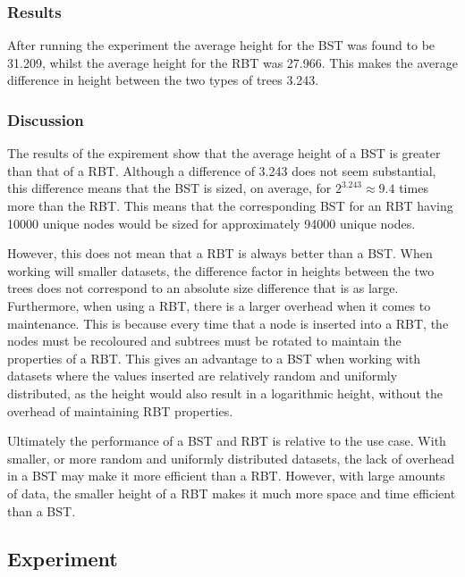 \documentclass[letterpaper]{article}
\theoremstyle{plain}
\theoremstyle{definition}
\theoremstyle{remark}
\newcounter{experiment}
\begin{document}
\subsubsection*{Results}
After running the experiment the average height for the BST was found to be 31.209, whilst the average height for the RBT was 27.966. This makes the average difference in height between the two types of trees 3.243.
\subsubsection*{Discussion}
The results of the expirement show that the average height of a BST is greater than that of a RBT. Although a difference of 3.243 does not seem substantial, this difference means that the BST is sized, on average, for $2^{3.243} \approx 9.4$ times more than the RBT. This means that the corresponding BST for an RBT having 10000 unique nodes would be sized for approximately 94000 unique nodes.

However, this does not mean that a RBT is always better than a BST. When working will smaller datasets, the difference factor in heights between the two trees does not correspond to an absolute size difference that is as large. Furthermore, when using a RBT, there is a larger overhead when it comes to maintenance. This is because every time that a node is inserted into a RBT, the nodes must be recoloured and subtrees must be rotated to maintain the properties of a RBT. This gives an advantage to a BST when working with datasets where the values inserted are relatively random and uniformly distributed, as the height would also result in a logarithmic height, without the overhead of maintaining RBT properties.

Ultimately the performance of a BST and RBT is relative to the use case. With smaller, or more random and uniformly distributed datasets, the lack of overhead in a BST may make it more efficient than a RBT. However, with large amounts of data, the smaller height of a RBT makes it much more space and time efficient than a BST.


\newpage
{}    
\subsection*{Experiment \theexperiment}
\end{document}
